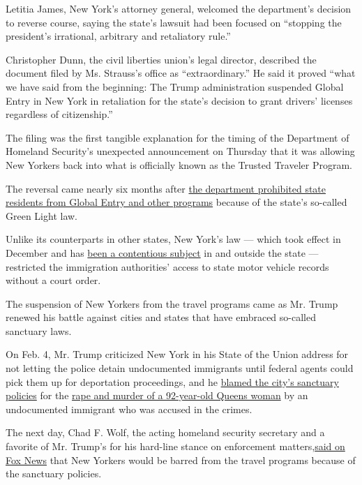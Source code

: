 Letitia James, New York's attorney general, welcomed the department's
decision to reverse course, saying the state's lawsuit had been focused
on ``stopping the president's irrational, arbitrary and retaliatory
rule.''

Christopher Dunn, the civil liberties union's legal director, described
the document filed by Ms. Strauss's office as ``extraordinary.'' He said
it proved ``what we have said from the beginning: The Trump
administration suspended Global Entry in New York in retaliation for the
state's decision to grant drivers' licenses regardless of citizenship.''

The filing was the first tangible explanation for the timing of the
Department of Homeland Security's unexpected announcement on Thursday
that it was allowing New Yorkers back into what is officially known as
the Trusted Traveler Program.

The reversal came nearly six months after
\href{https://www.nytimes.com/2020/02/06/us/politics/dhs-new-york-global-entry.html}{the
department prohibited state residents from Global Entry and other
programs} because of the state's so-called Green Light law.

Unlike its counterparts in other states, New York's law --- which took
effect in December and has
\href{https://www.nytimes.com/2019/11/14/nyregion/immigrants-drivers-license.html}{been
a contentious subject} in and outside the state --- restricted the
immigration authorities' access to state motor vehicle records without a
court order.

The suspension of New Yorkers from the travel programs came as Mr. Trump
renewed his battle against cities and states that have embraced
so-called sanctuary laws.

On Feb. 4, Mr. Trump criticized New York in his State of the Union
address for not letting the police detain undocumented immigrants until
federal agents could pick them up for deportation proceedings, and he
\href{https://www.nytimes.com/2020/02/05/us/politics/state-of-union-transcript.html}{blamed
the city's sanctuary policies} for the
\href{https://www.nytimes.com/2020/01/14/nyregion/92-year-old-woman-queens-murder.html}{rape
and murder of a 92-year-old Queens woman} by an undocumented immigrant
who was accused in the crimes.

The next day, Chad F. Wolf, the acting homeland security secretary and a
favorite of Mr. Trump's for his hard-line stance on enforcement
matters,\href{https://www.foxnews.com/politics/dhs-global-entry-trusted-traveler-new-york-ice-sanctuary-law}{said
on Fox News} that New Yorkers would be barred from the travel programs
because of the sanctuary policies.

